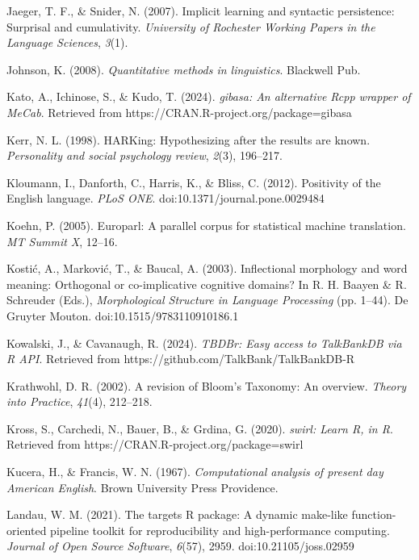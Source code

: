 \documentclass[
  letterpaper,
  krantz1]{latex/krantz-mod}
\newlength{\cslhangindent}
\newenvironment{CSLReferences}[2] %
 {\begin{list}{}{%
  \setlength{\itemindent}{0pt}
  \setlength{\leftmargin}{0pt}
  \setlength{\parsep}{0pt}
  \ifodd #1
   \setlength{\leftmargin}{\cslhangindent}
   \setlength{\itemindent}{-1\cslhangindent}
  \fi
  \setlength{\itemsep}{#2\baselineskip}}}
 {\end{list}}
\theoremstyle{definition}
\theoremstyle{definition}
\theoremstyle{remark}
\begin{document}
\begin{CSLReferences}{1}{0}
Jaeger, T. F., \& Snider, N. (2007). Implicit learning and syntactic
persistence: {Surprisal} and cumulativity. \emph{University of Rochester
Working Papers in the Language Sciences}, \emph{3}(1).

Johnson, K. (2008). \emph{Quantitative methods in linguistics}.
Blackwell Pub.

Kato, A., Ichinose, S., \& Kudo, T. (2024). \emph{{gibasa}: An
alternative {Rcpp} wrapper of {MeCab}}. Retrieved from
https://CRAN.R-project.org/package=gibasa

Kerr, N. L. (1998). {HARKing}: {Hypothesizing} after the results are
known. \emph{Personality and social psychology review}, \emph{2}(3),
196--217.

Kloumann, I., Danforth, C., Harris, K., \& Bliss, C. (2012). Positivity
of the {English} language. \emph{PLoS ONE}.
doi:10.1371/journal.pone.0029484

Koehn, P. (2005). Europarl: A parallel corpus for statistical machine
translation. \emph{MT Summit X}, 12--16.

Kostić, A., Marković, T., \& Baucal, A. (2003). Inflectional morphology
and word meaning: {Orthogonal} or co-implicative cognitive domains? In
R. H. Baayen \& R. Schreuder (Eds.), \emph{Morphological {Structure} in
{Language Processing}} (pp. 1--44). De Gruyter Mouton.
doi:10.1515/9783110910186.1

Kowalski, J., \& Cavanaugh, R. (2024). \emph{{TBDBr}: Easy access to
TalkBankDB via {R API}}. Retrieved from
https://github.com/TalkBank/TalkBankDB-R

Krathwohl, D. R. (2002). A revision of {Bloom}'s {Taxonomy}: {An}
overview. \emph{Theory into Practice}, \emph{41}(4), 212--218.

Kross, S., Carchedi, N., Bauer, B., \& Grdina, G. (2020). \emph{{swirl}:
Learn {R}, in {R}}. Retrieved from
https://CRAN.R-project.org/package=swirl

Kucera, H., \& Francis, W. N. (1967). \emph{Computational analysis of
present day {American English}}. Brown University Press Providence.

Landau, W. M. (2021). The targets {R} package: A dynamic make-like
function-oriented pipeline toolkit for reproducibility and
high-performance computing. \emph{Journal of Open Source Software},
\emph{6}(57), 2959. doi:10.21105/joss.02959


\end{CSLReferences}
\end{document}
